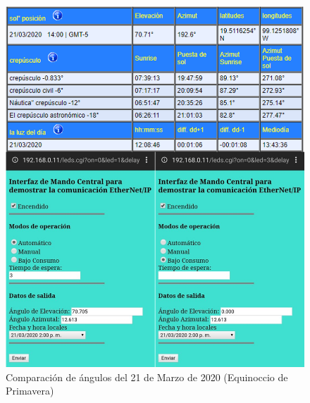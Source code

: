\begin{figure}[H]
	\centering
	\includegraphics[width=\columnwidth]{imagenes/VAL_P}
	\caption{Comparación de ángulos del 21 de Marzo de 2020 (Equinoccio de Primavera)}
	\label{fig:VAL_P}
\end{figure}

